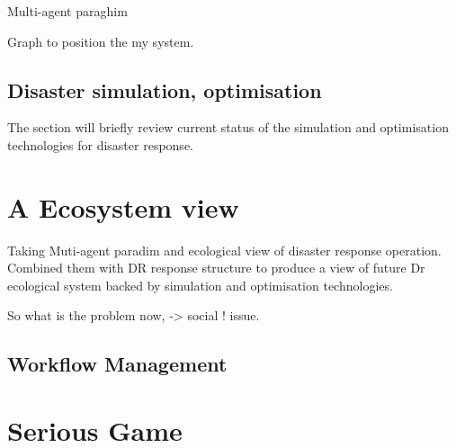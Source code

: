 Multi-agent paraghim 


Graph to position the my system. 

\subsection{Disaster simulation, optimisation}
The section will briefly review current status of the simulation and optimisation technologies for disaster response.



\section{A Ecosystem view}

Taking Muti-agent paradim and ecological view of disaster response operation. Combined them with DR response structure to produce a view of future Dr ecological system backed by simulation and optimisation technologies. 

So what is the problem now, -> social ! issue. 





\subsection{Workflow Management}



\section{Serious Game}








